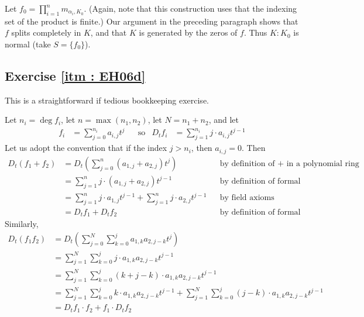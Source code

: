 \documentclass[oneside, english, 11pt]{article}
\begin{document}
Let $f_{0} = \prod_{i = 1}^{n} m_{\alpha_{i}, K_{0}}$. (Again, note that this construction uses that the indexing set of the product is finite.) Our argument in the preceding paragraph shows that $f$ splits completely in $K$, and that $K$ is generated by the zeros of $f$. Thus $K : K_{0}$ is normal (take $S = \{f_{0}\}$).



\subsection*{Exercise \ref{itm : EH06d}}

This is a straightforward if tedious bookkeeping exercise.

Let $n_{i} = \deg f_{i}$, let $n = \max(n_{1}, n_{2})$, let $N = n_{1} + n_{2}$, and let
\begin{align*}
f_{i}
&=
\sum_{j = 0}^{n_{i}} a_{i, j} t^{j}
&
&\text{so}
&
D_{t} f_{i}
&=
\sum_{j = 1}^{n_{i}} j \cdot a_{i, j} t^{j - 1}
\end{align*}
Let us adopt the convention that if the index $j > n_{i}$, then $a_{i, j} = 0$. Then
\begin{align*}
D_{t}(f_{1} + f_{2})
&=
D_{t}\left(\sum_{j = 0}^{n} (a_{1, j} + a_{2, j}) t^{j}\right)
&
&\text{by definition of $+$ in a polynomial ring}
\\
&=
\sum_{j = 1}^{n} j \cdot (a_{1, j} + a_{2, j}) t^{j - 1}
&
&\text{by definition of formal derivative}
\\
&=
\sum_{j = 1}^{n} j \cdot a_{1, j} t^{j - 1} + \sum_{j = 1}^{n} j \cdot a_{2, j} t^{j - 1}
&
&\text{by field axioms}
\\
&=
D_{t} f_{1} + D_{t} f_{2}
&
&\text{by definition of formal derivative}
\end{align*}
Similarly,
\begin{align*}
D_{t}(f_{1} f_{2})
&=
D_{t}\left(\sum_{j = 0}^{N} \sum_{k = 0}^{j} a_{1, k} a_{2, j - k} t^{j}\right)
\\
&=
\sum_{j = 1}^{N} \sum_{k = 0}^{j} j \cdot a_{1, k} a_{2, j - k} t^{j - 1}
\\
&=
\sum_{j = 1}^{N} \sum_{k = 0}^{j} (k + j - k) \cdot a_{1, k} a_{2, j - k} t^{j - 1}
\\
&=
\sum_{j = 1}^{N} \sum_{k = 0}^{j} k \cdot a_{1, k} a_{2, j - k} t^{j - 1} + \sum_{j = 1}^{N} \sum_{k = 0}^{j} (j - k) \cdot a_{1, k} a_{2, j - k} t^{j - 1}
\\
&=
D_{t} f_{1} \cdot f_{2} + f_{1} \cdot D_{t} f_{2}
\end{align*}
\end{document}
